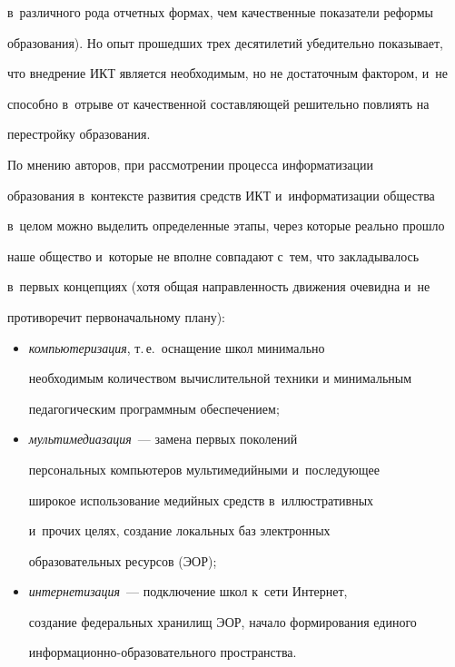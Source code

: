 в~различного рода отчетных формах, чем качественные показатели реформы


образования). Но опыт прошедших трех десятилетий убедительно показывает,


что внедрение ИКТ является необходимым, но не достаточным фактором, и~не


способно в~отрыве от качественной составляющей решительно повлиять на


перестройку образования.





     По мнению авторов, при рассмотрении процесса информатизации


образования в~контексте развития средств ИКТ и~информатизации общества


в~целом можно выделить определенные этапы, через которые реально прошло


наше общество и~которые не вполне совпадают с~тем, что закладывалось


в~первых концепциях (хотя общая направленность движения очевидна и~не


противоречит первоначальному плану):


     \begin{itemize}


\item \textit{компьютеризация}, т.\,е.\ оснащение школ минимально


необходимым количеством вычислительной техники и минимальным


педагогическим программным обеспечением;


\item \textit{мультимедиазация}~--- замена первых поколений


персональных компьютеров мультимедийными и~последующее


широкое использование медийных средств в~иллюстративных


и~прочих целях, создание локальных баз электронных


образовательных ресурсов (ЭОР);


\item \textit{интернетизация}~--- подключение школ к~сети Интернет,


создание федеральных хранилищ ЭОР, начало формирования единого


ин\-фор\-ма\-ци\-он\-но-обра\-зо\-ва\-тель\-но\-го пространства.


\end{itemize}


